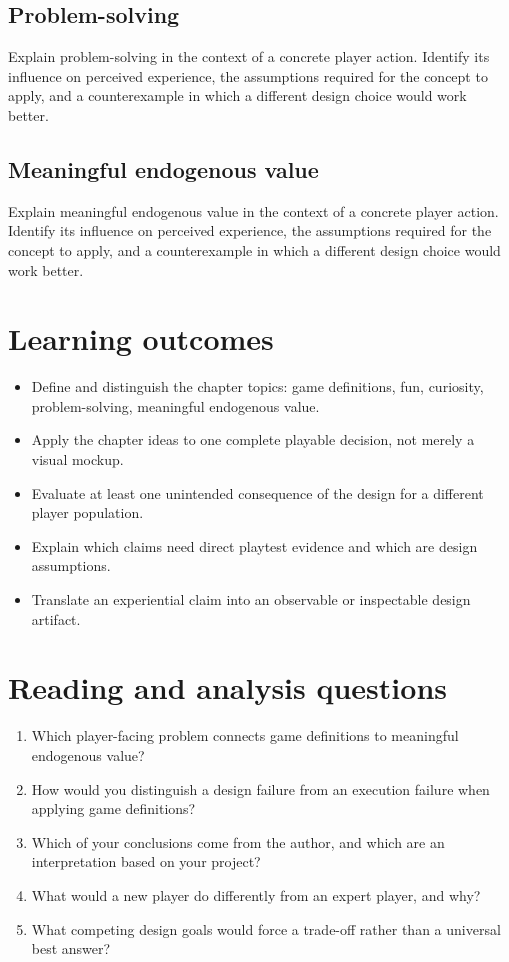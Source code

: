 \documentclass[11pt]{article}
\begin{document}
\subsection{Problem-solving}
Explain problem-solving in the context of a concrete player action. Identify its influence on perceived experience, the assumptions required for the concept to apply, and a counterexample in which a different design choice would work better.


\subsection{Meaningful endogenous value}
Explain meaningful endogenous value in the context of a concrete player action. Identify its influence on perceived experience, the assumptions required for the concept to apply, and a counterexample in which a different design choice would work better.


\section{Learning outcomes}
\begin{itemize}
\item Define and distinguish the chapter topics: game definitions, fun, curiosity, problem-solving, meaningful endogenous value.
\item Apply the chapter ideas to one complete playable decision, not merely a visual mockup.
\item Evaluate at least one unintended consequence of the design for a different player population.
\item Explain which claims need direct playtest evidence and which are design assumptions.
\item Translate an experiential claim into an observable or inspectable design artifact.
\end{itemize}

\section{Reading and analysis questions}
\begin{enumerate}
\item Which player-facing problem connects game definitions to meaningful endogenous value?
\item How would you distinguish a design failure from an execution failure when applying game definitions?
\item Which of your conclusions come from the author, and which are an interpretation based on your project?
\item What would a new player do differently from an expert player, and why?
\item What competing design goals would force a trade-off rather than a universal best answer?
\end{enumerate}
\end{document}
